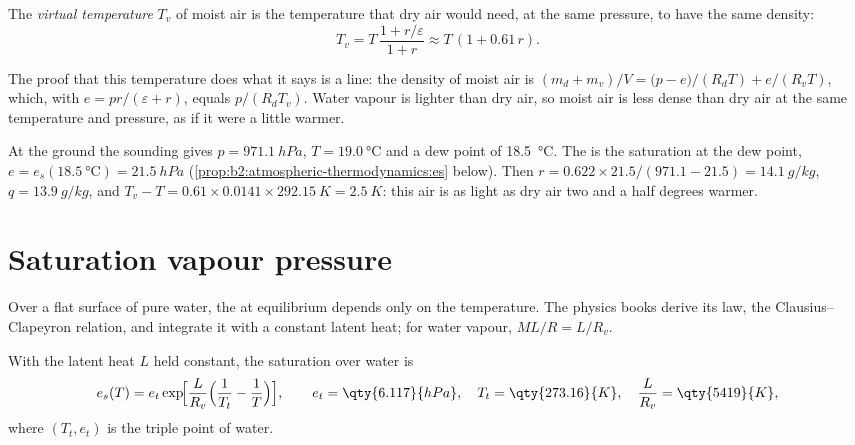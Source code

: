 \begin{definition}\label{def:b2:atmospheric-thermodynamics:virtual}
The \emph{virtual temperature} $T_v$ of moist air is the temperature
that dry air would need, at the same pressure, to have the same density:
\[
  T_v = T\,\frac{1 + r/\varepsilon}{1 + r} \approx T\,(1 + 0.61\,r) .
\]
\end{definition}

The proof that this temperature does what it says is a line: the density of moist air is
$(m_d + m_v)/V = \bigl(p - e\bigr)/(R_dT) + e/(R_vT)$, which, with $e = pr/(\varepsilon + r)$,
equals $p/(R_dT_v)$. Water vapour is lighter than dry air, so moist air is less dense than dry
air at the same temperature and pressure, as if it were a little warmer.

\begin{example}\label{ex:b2:atmospheric-thermodynamics:norman}
At the ground the sounding gives $p = \qty{971.1}{hPa}$, $T = \qty{19.0}{\celsius}$ and a dew
point of \qty{18.5}{\celsius}. The  is the saturation  at the dew
point, $e = e_s(\qty{18.5}{\celsius}) = \qty{21.5}{hPa}$ (\cref{prop:b2:atmospheric-thermodynamics:es}
below). Then $r = 0.622 \times 21.5/(971.1 - 21.5) = \qty{14.1}{g/kg}$, $q = \qty{13.9}{g/kg}$,
and $T_v - T = 0.61 \times 0.0141 \times \qty{292.15}{K} = \qty{2.5}{K}$: this air is as light as
dry air two and a half degrees warmer.
\end{example}

\section{Saturation vapour pressure}\label{sec:b2:atmospheric-thermodynamics:saturation}

Over a flat surface of pure water, the  at equilibrium depends only on the
temperature. The physics books derive its law, the Clausius--Clapeyron relation, and integrate it
with a constant latent heat; for water vapour, $M L/R = L/R_v$.

\begin{proposition}\label{prop:b2:atmospheric-thermodynamics:es}
With the latent heat $L$ held constant, the saturation  over water is
\[
  e_s(T) = e_t \exp\!\Bigl[\frac{L}{R_v}\Bigl(\frac{1}{T_t} - \frac{1}{T}\Bigr)\Bigr],
  \qquad e_t = \qty{6.117}{hPa}, \quad T_t = \qty{273.16}{K}, \quad \frac{L}{R_v} =
  \qty{5419}{K},
\]
where $(T_t, e_t)$ is the triple point of water.
\end{proposition}

